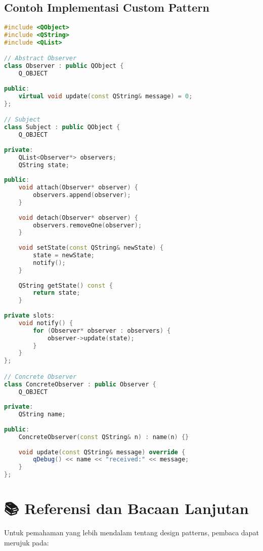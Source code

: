 \subsection{Contoh Implementasi Custom Pattern}

\begin{lstlisting}[language=c++, caption=Custom Observer dalam Qt]
#include <QObject>
#include <QString>
#include <QList>

// Abstract Observer
class Observer : public QObject {
    Q_OBJECT
    
public:
    virtual void update(const QString& message) = 0;
};

// Subject
class Subject : public QObject {
    Q_OBJECT
    
private:
    QList<Observer*> observers;
    QString state;
    
public:
    void attach(Observer* observer) {
        observers.append(observer);
    }
    
    void detach(Observer* observer) {
        observers.removeOne(observer);
    }
    
    void setState(const QString& newState) {
        state = newState;
        notify();
    }
    
    QString getState() const {
        return state;
    }
    
private slots:
    void notify() {
        for (Observer* observer : observers) {
            observer->update(state);
        }
    }
};

// Concrete Observer
class ConcreteObserver : public Observer {
    Q_OBJECT
    
private:
    QString name;
    
public:
    ConcreteObserver(const QString& n) : name(n) {}
    
    void update(const QString& message) override {
        qDebug() << name << "received:" << message;
    }
};
\end{lstlisting}

\section{📚 Referensi dan Bacaan Lanjutan}

Untuk pemahaman yang lebih mendalam tentang design patterns, pembaca dapat merujuk pada:

